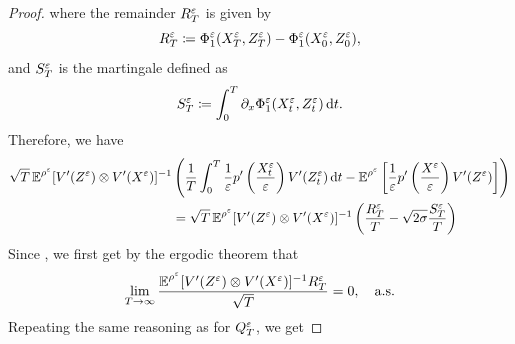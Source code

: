 \documentclass[10pt]{article}
\begin{document}
\begin{proof}
	where the remainder $R_T^\varepsilon$ is given by
	\begin{equation}
		R_T^\varepsilon \coloneqq \Phi_1^\varepsilon(X^\varepsilon_T, Z^\varepsilon_T) - \Phi_1^\varepsilon(X^\varepsilon_0, Z^\varepsilon_0),
	\end{equation}
	and $S^\varepsilon_T$ is the martingale defined as
	\begin{equation}
		S^\varepsilon_T \coloneqq \int_0^T \partial_x \Phi_1^\varepsilon(X_t^\varepsilon, Z_t^\varepsilon) \,\mathrm{d} t.
	\end{equation}
	Therefore, we have
	\begin{equation}
	\begin{aligned}
		\sqrt{T} \operatorname{\mathbb{E}}^{\rho^\varepsilon} [ V'(Z^\varepsilon) \otimes V'(X^\varepsilon) ]^{-1} & \left( \frac1T \int_0^T \frac{1}{\varepsilon} p' \left ( \frac{X^\varepsilon_t}{\varepsilon} \right ) V'(Z^\varepsilon_t) \,\mathrm{d} t - \operatorname{\mathbb{E}}^{\rho^\varepsilon} \left [ \frac{1}{\varepsilon} p' \left ( \frac{X^\varepsilon}{\varepsilon} \right ) V'(Z^\varepsilon) \right ] \right) \\
		&= \sqrt{T} \operatorname{\mathbb{E}}^{\rho^\varepsilon} [ V'(Z^\varepsilon) \otimes V'(X^\varepsilon) ]^{-1} \left( \frac{R_T^\varepsilon}{T} - \sqrt{2\sigma}\frac{S^\varepsilon_T}{T} \right)
	\end{aligned}
	\end{equation}
	Since , we first get by the ergodic theorem that
	\begin{equation}
		\lim_{T \to \infty} \frac{\operatorname{\mathbb{E}}^{\rho^\varepsilon} [ V'(Z^\varepsilon) \otimes V'(X^\varepsilon) ]^{-1} R_T^\varepsilon}{\sqrt{T}} = 0, \quad \text{a.s.}
	\end{equation}
	Repeating the same reasoning as for $Q_T^\varepsilon$, we get 

\end{proof}
\end{document}
